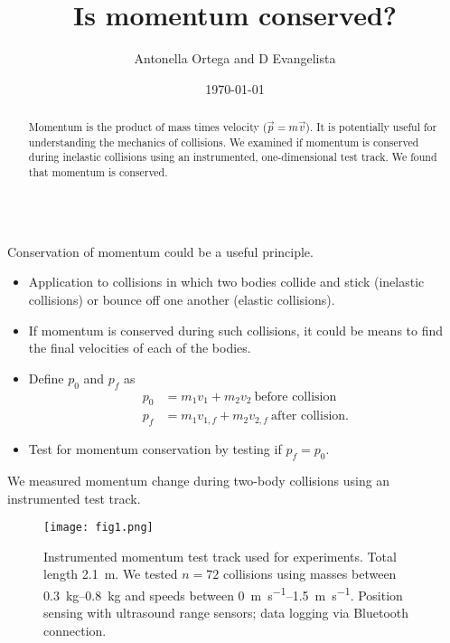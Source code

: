 \documentclass[pdf,serif]{beamer}
\title{Is momentum conserved?}
\author{Antonella Ortega and D Evangelista}
\institute{Morristown-Beard School}
\date{\today}
\begin{document}
\begin{frame}{}
\begin{columns}[T,totalwidth=\textwidth]
\begin{column}{14.33in}
\begin{minipage}[t][\textheight]{\linewidth}
\begin{abstract}
Momentum is the product of mass times velocity ($\vec{p}=m\vec{v}$). It is potentially useful for understanding the mechanics of collisions. We examined if momentum is conserved during inelastic collisions using an instrumented, one-dimensional test track. We found that momentum is conserved.
\end{abstract}
\vfill
\begin{block}{Conservation of momentum could be a useful principle.}
\begin{itemize}
\item Application to collisions in which two bodies collide and stick (inelastic collisions) or bounce off one another (elastic collisions). 
\item If momentum is conserved during such collisions, it could be means to find the final velocities of each of the bodies. 
\item Define $p_0$ and $p_f$ as
\begin{align*}
p_0 &= m_1 v_1 + m_2 v_2\ \text{before collision} \\
p_f &= m_1 v_{1,f} + m_2 v_{2,f}\ \text{after collision}. 
\end{align*}
\item Test for momentum conservation by testing if $p_f=p_0$.
\end{itemize}
\end{block}
\vfill
\begin{block}{We measured momentum change during two-body collisions using an instrumented test track.}
\begin{figure}[h]
\begin{center}
\texttt{[image: fig1.png]}
\end{center}
\caption{Instrumented momentum test track used for experiments. Total length \SI{2.1}{\meter}. We tested $n=72$ collisions using masses between \SIrange{0.3}{0.8}{\kilo\gram} and speeds between \SIrange{0}{1.5}{\meter\per\second}. Position sensing with ultrasound range sensors; data logging via Bluetooth connection.}
\label{fig:methods1}
\end{figure}
\end{block}
\vfill
\end{minipage}
\end{column}


\end{columns}
\end{frame}
\end{document}
